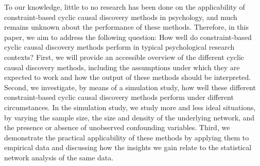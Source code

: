 \documentclass[twoside, 11pt]{article}
\begin{document}
To our knowledge, little to no research has been done on the applicability of constraint-based cyclic causal discovery methods in psychology, and much remains unknown about the performance of these methods.
Therefore, in this paper, we aim to address the following question: How well do constraint-based cyclic causal discovery methods perform in typical psychological research contexts? First, we will provide an accessible overview of the different cyclic causal discovery methods, including the assumptions under which they are expected to work and how the output of these methods should be interpreted. Second, we investigate, by means of a simulation study, how well these different constraint-based cyclic causal discovery methods perform under different circumstances. In the simulation study, we study more and less ideal situations, by varying the sample size, the size and density of the underlying network, and the presence or absence of unobserved confounding variables. Third, we demonstrate the practical applicability of these methods by applying them to empirical data \citep{mcnally_co-morbid_2017} and discussing how the insights we gain relate to the statistical network analysis of the same data.

\end{document}
